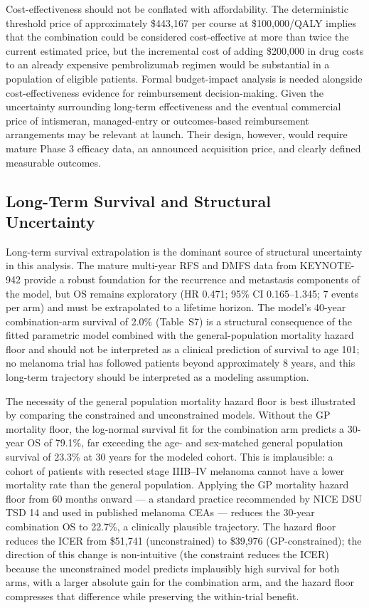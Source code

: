 \documentclass[12pt,a4paper]{article}
\begin{document}
Cost-effectiveness should not be conflated with affordability. The deterministic threshold price of approximately \$443,167 per course at \$100,000/QALY implies that the combination could be considered cost-effective at more than twice the current estimated price, but the incremental cost of adding \$200,000 in drug costs to an already expensive \mbox{pembrolizumab} regimen would be substantial in a population of eligible patients. Formal budget-impact analysis is needed alongside cost-effectiveness evidence for reimbursement decision-making. Given the uncertainty surrounding long-term effectiveness and the eventual commercial price of intismeran, managed-entry or outcomes-based reimbursement arrangements may be relevant at launch. Their design, however, would require mature Phase 3 efficacy data, an announced acquisition price, and clearly defined measurable outcomes.

\subsection{Long-Term Survival and Structural Uncertainty}

Long-term survival extrapolation is the dominant source of structural uncertainty in this analysis. The mature multi-year RFS and DMFS data from \mbox{KEYNOTE-942} provide a robust foundation for the recurrence and metastasis components of the model, but OS remains exploratory (HR 0.471; 95\% CI 0.165--1.345; 7 events per arm) and must be extrapolated to a lifetime horizon. The model's 40-year combination-arm survival of 2.0\% (Table~S7) is a structural consequence of the fitted parametric model combined with the general-population mortality hazard floor and should not be interpreted as a clinical prediction of survival to age 101; no melanoma trial has followed patients beyond approximately 8 years, and this long-term trajectory should be interpreted as a modeling assumption.

The necessity of the general population mortality hazard floor is best illustrated by comparing the constrained and unconstrained models. Without the GP mortality floor, the log-normal survival fit for the combination arm predicts a 30-year OS of 79.1\%, far exceeding the age- and sex-matched general population survival of 23.3\% at 30 years for the modeled cohort. This is implausible: a cohort of patients with resected stage IIIB--IV melanoma cannot have a lower mortality rate than the general population. Applying the GP mortality hazard floor from 60 months onward --- a standard practice recommended by NICE DSU TSD 14 \cite{latimer2011} and used in published melanoma CEAs \cite{zhang2023} --- reduces the 30-year combination OS to 22.7\%, a clinically plausible trajectory. The hazard floor reduces the ICER from \$51,741 (unconstrained) to \$39,976 (GP-constrained); the direction of this change is non-intuitive (the constraint reduces the ICER) because the unconstrained model predicts implausibly high survival for both arms, with a larger absolute gain for the combination arm, and the hazard floor compresses that difference while preserving the within-trial benefit.
\end{document}
